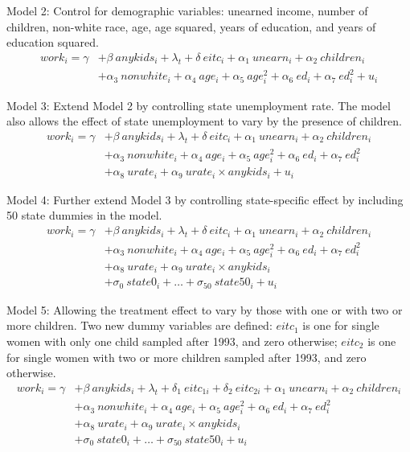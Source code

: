 \documentclass{article}
\begin{document}
\begin{enumerate}
Model 2: Control for demographic variables: unearned income, number of children, non-white race, 
age, age squared, years of education, and years of education squared. 
\begin{align*}
work_i = \gamma & + \beta\ anykids_i + \lambda_t + \delta\ eitc_i + \alpha_1\ unearn_i + \alpha_2\ children_i \\ 
                & + \alpha_3\ nonwhite_i  + \alpha_4\ age_i + \alpha_5\ age_i^2 + \alpha_6\ ed_i  + \alpha_7\ ed_i^2 + u_i 
\end{align*}

Model 3: Extend Model 2 by controlling state unemployment rate. The model also allows the effect of  
state unemployment to vary by the presence of children. 
\begin{align*}
work_i = \gamma & + \beta\ anykids_i + \lambda_t + \delta\ eitc_i + \alpha_1\ unearn_i + \alpha_2\ children_i \\
                & + \alpha_3\ nonwhite_i  + \alpha_4\ age_i + \alpha_5\ age_i^2 + \alpha_6\ ed_i  + \alpha_7\ ed_i^2 \\
                & + \alpha_8\ urate_i + \alpha_9\ urate_i\times anykids_i + u_i 
\end{align*}

Model 4: Further extend Model 3 by controlling state-specific effect by including 50 state dummies in the model.
\begin{align*}
work_i = \gamma & + \beta\ anykids_i + \lambda_t + \delta\ eitc_i + \alpha_1\ unearn_i + \alpha_2\ children_i \\
                & + \alpha_3\ nonwhite_i + \alpha_4\ age_i + \alpha_5\ age_i^2 + \alpha_6\ ed_i  + \alpha_7\ ed_i^2 \\
                & + \alpha_8\ urate_i + \alpha_9\ urate_i\times anykids_i \\
                & + \sigma_0\ state0_i + \dots + \sigma_{50}\ state50_i + u_i 
\end{align*}

Model 5: Allowing the treatment effect to vary by those with one or with two or more children. Two new dummy variables 
are defined: $eitc_{1}$ is one for single women with only one child sampled after 1993, and zero otherwise; 
$eitc_{2}$ is one for single women with two or more children sampled after 1993, and zero otherwise.
\begin{align*}
work_i = \gamma & + \beta\ anykids_i + \lambda_t + \delta_1\ eitc_{1i} + \delta_2\ eitc_{2i} + \alpha_1\ unearn_i + \alpha_2\ children_i \\
                & + \alpha_3\ nonwhite_i + \alpha_4\ age_i + \alpha_5\ age_i^2 + \alpha_6\ ed_i  + \alpha_7\ ed_i^2 \\
                & + \alpha_8\ urate_i + \alpha_9\ urate_i\times anykids_i \\
                & + \sigma_0\ state0_i + \dots + \sigma_{50}\ state50_i + u_i 
\end{align*}


\end{enumerate}
\end{document}
